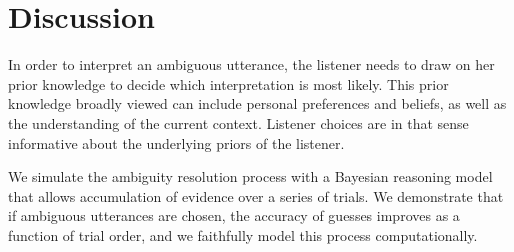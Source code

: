 \documentclass[10pt,a4paper]{article}
\begin{document}
%

\section{Discussion}

In order to interpret an ambiguous utterance, the listener needs to draw on her prior knowledge to decide which interpretation is most likely. This prior knowledge broadly viewed can include personal preferences and beliefs, as well as the understanding of the current context. Listener choices are in that sense informative about the underlying priors of the listener. 

We simulate the ambiguity resolution process with a Bayesian reasoning model that allows accumulation of evidence over a series of trials. We demonstrate that if ambiguous utterances are chosen, the accuracy of guesses improves as a function of trial order, and we faithfully model this process computationally.


%
%


\setlength{\bibleftmargin}{.125in}
\setlength{\bibindent}{-\bibleftmargin}


\end{document}
